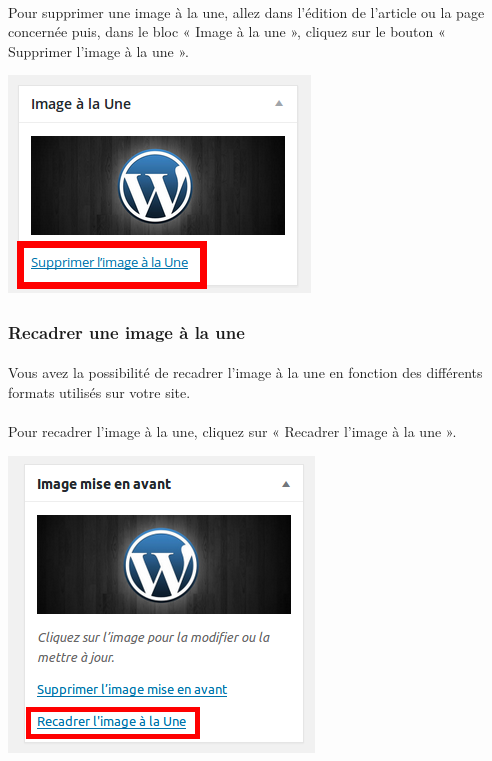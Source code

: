 \documentclass[10pt,a4paper]{article}
\begin{document}
\paragraph{}Pour supprimer une image à la une, allez dans l'édition de l'article ou la page concernée puis, dans le bloc « Image à la une », cliquez sur le bouton « Supprimer l'image à la une ».
\begin{center}
\includegraphics[scale=0.3]{img/0101.png}
\end{center}
\subsubsection{Recadrer une image à la une}
\paragraph{}Vous avez la possibilité de recadrer l'image à la une en fonction des différents formats utilisés sur votre site.
\paragraph{}Pour recadrer l'image à la une, cliquez sur « Recadrer l'image à la une ».
\begin{center}
\includegraphics[scale=0.3]{img/0101b.png}
\end{center}
\end{document}
